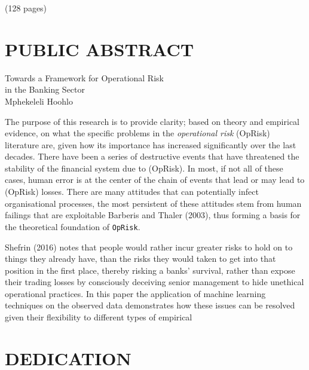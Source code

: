 \documentclass[]{DissertateUSU}
\begin{document}
\hspace{11 cm} (128 pages)

\singlespacing

\newpage

 \fancyhead[R]{\thepage} \fancyfoot[C]{}
\chapter*{PUBLIC ABSTRACT}

\doublespacing

\begin{center}
Towards a Framework for Operational Risk \\ 
in the Banking Sector \\
Mphekeleli Hoohlo
\end{center}

\vspace{12pt}

The purpose of this research is to provide clarity; based on theory and
empirical evidence, on what the specific problems in the
\emph{operational risk} (OpRisk) literature are, given how its
importance has increased significantly over the last decades. There have
been a series of destructive events that have threatened the stability
of the financial system due to (OpRisk). In most, if not all of these
cases, human error is at the center of the chain of events that lead or
may lead to (OpRisk) losses. There are many attitudes that can
potentially infect organisational processes, the most persistent of
these attitudes stem from human failings that are exploitable Barberis
and Thaler (2003), thus forming a basis for the theoretical foundation
of \texttt{OpRisk}.

Shefrin (2016) notes that people would rather incur greater risks to
hold on to things they already have, than the risks they would taken to
get into that position in the first place, thereby risking a banks'
survival, rather than expose their trading losses by consciously
deceiving senior management to hide unethical operational practices. In
this paper the application of machine learning techniques on the
observed data demonstrates how these issues can be resolved given their
flexibility to different types of empirical

\singlespacing

\newpage

 \fancyhead[R]{\thepage} \fancyfoot[C]{}
\chapter*{DEDICATION} 
\end{document}
